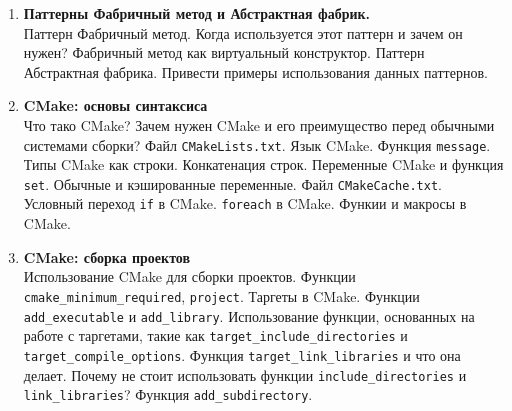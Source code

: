 \documentclass{article}
\begin{document}
\begin{enumerate}
\item \textbf{Паттерны Фабричный метод и Абстрактная фабрик.}\\
Паттерн Фабричный метод. Когда используется этот паттерн и зачем он нужен? Фабричный метод как виртуальный конструктор. Паттерн Абстрактная фабрика. Привести примеры использования данных паттернов.


\item \textbf{CMake: основы синтаксиса}\\
Что тако CMake? Зачем нужен CMake и его преимущество перед обычными системами сборки? Файл \texttt{CMakeLists.txt}. Язык CMake. Функция \texttt{message}. Типы CMake как строки. Конкатенация строк. Переменные CMake и функция \texttt{set}. Обычные и кэшированные переменные. Файл \texttt{CMakeCache.txt}. Условный переход \texttt{if} в CMake. \texttt{foreach} в CMake. Функии и макросы в CMake.

\item \textbf{CMake: сборка проектов}\\
Использование CMake для сборки проектов. Функции \texttt{cmake\_minimum\_required}, \texttt{project}. Таргеты в CMake. Функции \texttt{add\_executable} и \texttt{add\_library}. Использование функции, основанных на работе с таргетами, такие как \texttt{target\_include\_directories} и \texttt{target\_compile\_options}. Функция \texttt{target\_link\_libraries} и что она делает. Почему не стоит использовать функции \texttt{include\_directories} и \texttt{link\_libraries}? Функция \texttt{add\_subdirectory}. 

\fi

\end{enumerate}
\end{document}
